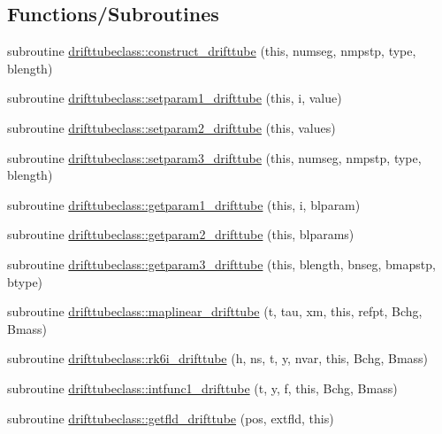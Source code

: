 \subsection*{Functions/\+Subroutines}
\begin{DoxyCompactItemize}
\item 
subroutine \mbox{\hyperlink{namespacedrifttubeclass_a322f55e58fbe6fb5e4ed93cd126e5ede}{drifttubeclass\+::construct\+\_\+drifttube}} (this, numseg, nmpstp, type, blength)
\item 
subroutine \mbox{\hyperlink{namespacedrifttubeclass_ae2e1974821a810c5d65afd4546b1a690}{drifttubeclass\+::setparam1\+\_\+drifttube}} (this, i, value)
\item 
subroutine \mbox{\hyperlink{namespacedrifttubeclass_a3883fd9688d0b98e279f57547de67b8c}{drifttubeclass\+::setparam2\+\_\+drifttube}} (this, values)
\item 
subroutine \mbox{\hyperlink{namespacedrifttubeclass_a5c05a55ca0f98570b2b02f3c84181015}{drifttubeclass\+::setparam3\+\_\+drifttube}} (this, numseg, nmpstp, type, blength)
\item 
subroutine \mbox{\hyperlink{namespacedrifttubeclass_ade5fb645fa735d4743cd431024727261}{drifttubeclass\+::getparam1\+\_\+drifttube}} (this, i, blparam)
\item 
subroutine \mbox{\hyperlink{namespacedrifttubeclass_af16030dcb46192b3748c28ceb1ca7d4f}{drifttubeclass\+::getparam2\+\_\+drifttube}} (this, blparams)
\item 
subroutine \mbox{\hyperlink{namespacedrifttubeclass_a4dc53dfc73175d3eb0d420c6cb9d64f8}{drifttubeclass\+::getparam3\+\_\+drifttube}} (this, blength, bnseg, bmapstp, btype)
\item 
subroutine \mbox{\hyperlink{namespacedrifttubeclass_aaf41c0aaec4dc3e16fc0f678b3220de3}{drifttubeclass\+::maplinear\+\_\+drifttube}} (t, tau, xm, this, refpt, Bchg, Bmass)
\item 
subroutine \mbox{\hyperlink{namespacedrifttubeclass_a186a18efb61fce23e16a18534af446fb}{drifttubeclass\+::rk6i\+\_\+drifttube}} (h, ns, t, y, nvar, this, Bchg, Bmass)
\item 
subroutine \mbox{\hyperlink{namespacedrifttubeclass_a053027aad7a9b20bafb34d676de9a14a}{drifttubeclass\+::intfunc1\+\_\+drifttube}} (t, y, f, this, Bchg, Bmass)
\item 
subroutine \mbox{\hyperlink{namespacedrifttubeclass_aa903101ae6943402917a2f29a8aa67d3}{drifttubeclass\+::getfld\+\_\+drifttube}} (pos, extfld, this)
\end{DoxyCompactItemize}
